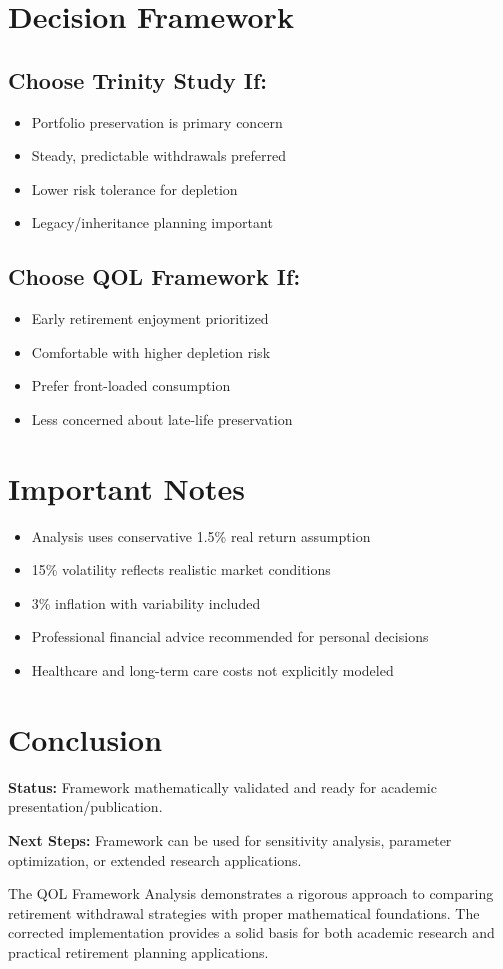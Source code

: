 \documentclass[11pt,letterpaper]{article}
\begin{document}
\section{Decision Framework}

\subsection{Choose Trinity Study If:}
\begin{itemize}
    \item Portfolio preservation is primary concern
    \item Steady, predictable withdrawals preferred
    \item Lower risk tolerance for depletion
    \item Legacy/inheritance planning important
\end{itemize}

\subsection{Choose QOL Framework If:}
\begin{itemize}
    \item Early retirement enjoyment prioritized
    \item Comfortable with higher depletion risk
    \item Prefer front-loaded consumption
    \item Less concerned about late-life preservation
\end{itemize}

\section{Important Notes}
\begin{itemize}
    \item Analysis uses conservative 1.5\% real return assumption
    \item 15\% volatility reflects realistic market conditions
    \item 3\% inflation with variability included
    \item Professional financial advice recommended for personal decisions
    \item Healthcare and long-term care costs not explicitly modeled
\end{itemize}

\section{Conclusion}

\textbf{Status:} Framework mathematically validated and ready for academic presentation/publication.

\textbf{Next Steps:} Framework can be used for sensitivity analysis, parameter optimization, or extended research applications.

The QOL Framework Analysis demonstrates a rigorous approach to comparing retirement withdrawal strategies with proper mathematical foundations. The corrected implementation provides a solid basis for both academic research and practical retirement planning applications.
\end{document}
